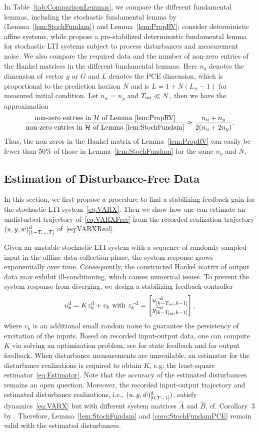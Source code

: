 In Table~\ref{tab:ComparisonLemmas}, we compare the different fundamental lemmas, including the stochastic fundamental lemma by \citet{pan23stochastic} (Lemma~\ref{lem:StochFundam}) and Lemma~\ref{lem:PropRV}; \citet{berberich22linear} consider deterministic affine systems, while \citet{kerz23data} propose a pre-stabilized deterministic fundamental lemma for stochastic LTI systems subject to process disturbances and measurement noise. We also compare the required data and the number of non-zero entries of the Hankel matrices in the different fundamental lemmas. Here $n_g$ denotes the dimension of vector $g$ or $G$ and $L$ denotes the PCE dimension, which is proportional to the prediction horizon $N$ and is $L=1+N(L_w-1)$ for measured initial condition. Let $n_w=n_y$ and $T_\text{ini}\ll N$, then we have the approximation
\[
	\frac{\text{non-zero entries in~}\mathcal{H}~\text{of Lemma~\ref{lem:PropRV}}}{\text{non-zero entries in~}\mathcal{H}~\text{of Lemma~\ref{lem:StochFundam}}}\approx\frac{n_u+n_y}{2(n_u+2n_y)}.
\]
Thus, the non-zeros in the Hankel matrix of Lemma~\ref{lem:PropRV} can easily be fewer than 50\% of those in Lemma~\ref{lem:StochFundam} for the same $n_g$ and $N$.

\subsection{Estimation of Disturbance-Free Data} \label{sec:Estimation}
In this section, we first propose a procedure to find a stabilizing feedback gain for the stochastic LTI system~\eqref{eq:VARX}. Then we show how one can estimate an undisturbed trajectory of~\eqref{eq:VARXFree} from the recorded realization trajectory $(u,y,w)_{[1-T_\text{ini},T]}^{\mathrm{d}}$ of~\eqref{eq:VARXReal}.

Given an unstable stochastic LTI system with a sequence of randomly sampled input in the offline data collection phase, the system response grows exponentially over time. Consequently, the constructed Hankel matrix of output data may exhibit ill-conditioning, which causes numerical issues. To prevent the system response from diverging, we design a stabilizing feedback controller
\[
u_k^{\mathrm{d}}=Kz_k^{\mathrm{d}} +v_k \text{ with }z_k^{\neg\mathrm{d}} = \begin{bmatrix} u_{[k-T_\text{ini},k-1]}^{\neg\mathrm{d}}\\ y_{[k-T_\text{ini},k-1]}^{\neg\mathrm{d}} \end{bmatrix},
\]
where $v_k$ is an additional small random noise to guarantee the persistency of excitation of the inputs. Based on recorded input-output data, one can compute $K$ via solving an optimization problem, see \citet{doerfler23on} for state feedback and \citet{pan24data} for output feedback. When disturbance measurements are unavailable, an estimator for the disturbance realizations is required to obtain $K$, e.g. the least-square estimator~\eqref{eq:Estimator}.
Note that the accuracy of the estimated disturbances remains an open question. Moreover, the recorded input-output trajectory and estimated disturbance realizations, i.e., $(u,y,\hat{w})_{[0,T-1]}^{\mathrm{d}})$, satisfy dynamics~\eqref{eq:VARX} but with different system matrices $\hat{A}$ and $\hat{B}$, cf. Corollary~3 by \citet{pan24data}. Therefore, Lemma~\ref{lem:StochFundam} and \ref{coro:StochFundamPCE} remain valid with the estimated disturbances.

